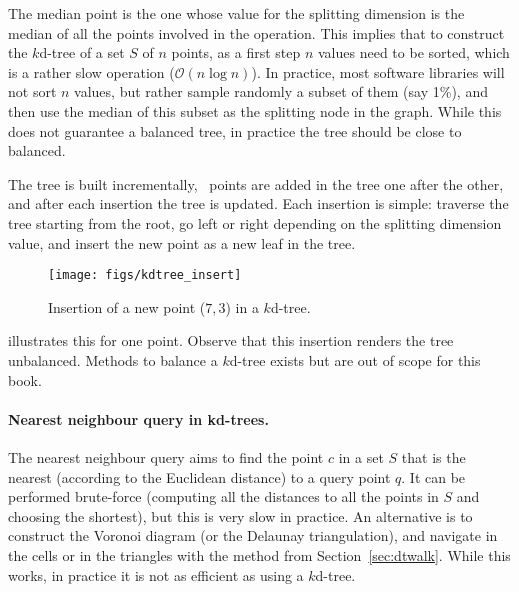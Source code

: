 The median point is the one whose value for the splitting dimension is the median of all the points involved in the operation.
This implies that to construct the $k$d-tree of a set $S$ of $n$ points, as a first step $n$ values need to be sorted, which is a rather slow operation ($\mathcal{O}(n \log n)$).
In practice, most software libraries will not sort $n$ values, but rather sample randomly a subset of them (say 1\%), and then use the median of this subset as the splitting node in the graph.
While this does not guarantee a balanced tree, in practice the tree should be close to balanced.

The tree is built incrementally, \ie\ points are added in the tree one after the other, and after each insertion the tree is updated.
Each insertion is simple: traverse the tree starting from the root, go left or right depending on the splitting dimension value, and insert the new point as a new leaf in the tree.
\begin{figure}[tbp]
  \centering
  \texttt{[image: figs/kdtree\_insert]}
  \caption{Insertion of a new point ($7,3$) in a $k$d-tree.}%
\end{figure} 
illustrates this for one point.
Observe that this insertion renders the tree unbalanced.
Methods to balance a $k$d-tree exists but are out of scope for this book.


\paragraph{Nearest neighbour query in kd-trees.}%
\label{sec:knn}

The nearest neighbour query%
aims to find the point $c$ in a set $S$ that is the nearest (according to the Euclidean distance) to a query point $q$.
It can be performed brute-force (computing all the distances to all the points in $S$ and choosing the shortest), but this is very slow in practice.
An alternative is to construct the Voronoi diagram (or the Delaunay triangulation), and navigate in the cells or in the triangles with the method from Section~\ref{sec:dtwalk}.
While this works, in practice it is not as efficient as using a $k$d-tree.


%

